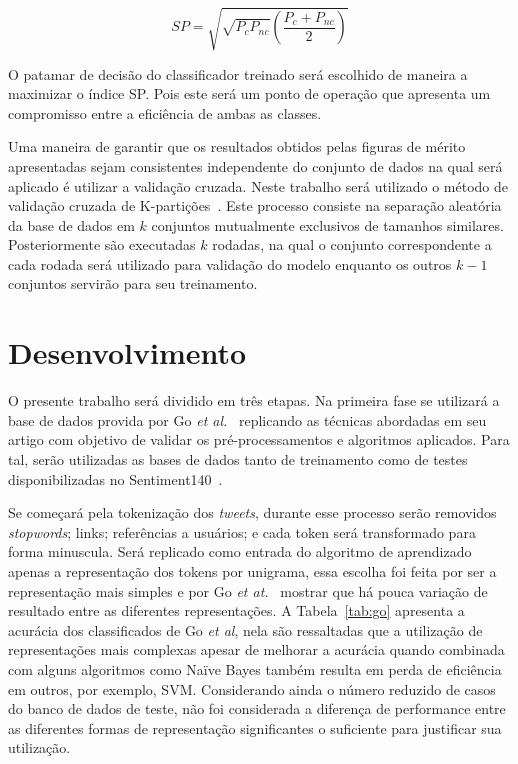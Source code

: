 \begin{equation} \label{eq:sp}
    SP = \sqrt{\sqrt{P_c P_{nc}} \left(\frac{P_c + P_{nc}}{2}\right)}
\end{equation}

O patamar de decisão do classificador treinado será escolhido de maneira a maximizar o índice SP.
Pois este será um ponto de operação que apresenta um compromisso entre a eficiência de ambas as classes.

Uma maneira de garantir que os resultados obtidos pelas figuras de mérito apresentadas sejam consistentes independente do
conjunto de dados na qual será aplicado é utilizar a validação cruzada.
Neste trabalho será utilizado o método de validação cruzada de K-partições~\cite{kohavi95}.
Este processo consiste na separação aleatória da base de dados em $k$ conjuntos mutualmente exclusivos de tamanhos
similares.
Posteriormente são executadas $k$ rodadas, na qual o conjunto correspondente a cada rodada será utilizado para validação
do modelo enquanto os outros $k-1$ conjuntos servirão para seu treinamento.

\section{Desenvolvimento} \label{sec:desenvolvimento}

O presente trabalho será dividido em três etapas.
Na primeira fase se utilizará a base de dados provida por Go \textit{et al.}~\cite{go09} replicando as técnicas
abordadas em seu artigo com objetivo de validar os pré-processamentos e algoritmos aplicados.
Para tal, serão utilizadas as bases de dados tanto de treinamento como de testes disponibilizadas no
Sentiment140~\cite{go09}.

Se começará pela tokenização dos \textit{tweets}, durante esse processo serão removidos \textit{stopwords}; links;
referências a usuários; e cada token será transformado para forma minuscula.
Será replicado como entrada do algoritmo de aprendizado apenas a representação dos tokens por unigrama, essa escolha foi
feita por ser a representação mais simples e por Go \textit{et at.}~\cite{go09} mostrar que há pouca variação de
resultado entre as diferentes representações.
A Tabela~\ref{tab:go} apresenta a acurácia dos classificados de Go \textit{et al}, nela são ressaltadas que a utilização
de representações mais complexas apesar de melhorar a acurácia quando combinada com alguns algoritmos como Naïve Bayes
também resulta em perda de eficiência em outros, por exemplo, SVM.
Considerando ainda o número reduzido de casos do banco de dados de teste, não foi considerada a diferença de performance
entre as diferentes formas de representação significantes o suficiente para justificar sua utilização.

